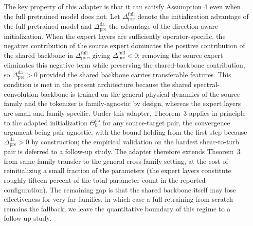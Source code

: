 \documentclass[preprint,12pt]{elsarticle}
\begin{document}
The key property of this adapter is that it can satisfy Assumption 4 even when the full pretrained model does not. Let $\Delta^{\mathrm{full}}_{\mathrm{pre}}$ denote the initialization advantage of the full pretrained model and $\Delta^{\mathrm{da}}_{\mathrm{pre}}$ the advantage of the direction-aware initialization. When the expert layers are sufficiently operator-specific, the negative contribution of the source expert dominates the positive contribution of the shared backbone in $\Delta^{\mathrm{full}}_{\mathrm{pre}}$, giving $\Delta^{\mathrm{full}}_{\mathrm{pre}}<0$; removing the source expert eliminates this negative term while preserving the shared-backbone contribution, so $\Delta^{\mathrm{da}}_{\mathrm{pre}}>0$ provided the shared backbone carries transferable features. This condition is met in the present architecture because the shared spectral-convolution backbone is trained on the general physical dynamics of the source family and the tokenizer is family-agnostic by design, whereas the expert layers are small and family-specific. Under this adapter, Theorem~3 applies in principle to the adapted initialization $\Theta^{\mathrm{da}}_0$ for any source-target pair, the convergence argument being pair-agnostic, with the bound holding from the first step because $\Delta^{\mathrm{da}}_{\mathrm{pre}}>0$ by construction; the empirical validation on the hardest shear-to-turb pair is deferred to a follow-up study. The adapter therefore extends Theorem~3 from same-family transfer to the general cross-family setting, at the cost of reinitializing a small fraction of the parameters (the expert layers constitute roughly fifteen percent of the total parameter count in the reported configuration). The remaining gap is that the shared backbone itself may lose effectiveness for very far families, in which case a full retraining from scratch remains the fallback; we leave the quantitative boundary of this regime to a follow-up study.
\end{document}
